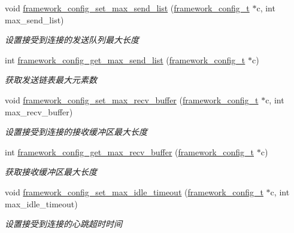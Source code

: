 \begin{DoxyCompactItemize}
void \hyperlink{a00093_ga6d3affd6639a3d75920197811c333fac_ga6d3affd6639a3d75920197811c333fac}{framework\+\_\+config\+\_\+set\+\_\+max\+\_\+send\+\_\+list} (\hyperlink{a00047_a55b26efa9e6ee05514d087ba2593a54b_a55b26efa9e6ee05514d087ba2593a54b}{framework\+\_\+config\+\_\+t} $\ast$c, int max\+\_\+send\+\_\+list)
\begin{DoxyCompactList}\small\item\em 设置接受到连接的发送队列最大长度 \end{DoxyCompactList}\item 
int \hyperlink{a00048_a5fdcaba78c9cbaa69f506d5eed77ca3b_a5fdcaba78c9cbaa69f506d5eed77ca3b}{framework\+\_\+config\+\_\+get\+\_\+max\+\_\+send\+\_\+list} (\hyperlink{a00047_a55b26efa9e6ee05514d087ba2593a54b_a55b26efa9e6ee05514d087ba2593a54b}{framework\+\_\+config\+\_\+t} $\ast$c)
\begin{DoxyCompactList}\small\item\em 获取发送链表最大元素数 \end{DoxyCompactList}\item 
void \hyperlink{a00093_ga582e128041da47fa6578aa150b5a615a_ga582e128041da47fa6578aa150b5a615a}{framework\+\_\+config\+\_\+set\+\_\+max\+\_\+recv\+\_\+buffer} (\hyperlink{a00047_a55b26efa9e6ee05514d087ba2593a54b_a55b26efa9e6ee05514d087ba2593a54b}{framework\+\_\+config\+\_\+t} $\ast$c, int max\+\_\+recv\+\_\+buffer)
\begin{DoxyCompactList}\small\item\em 设置接受到连接的接收缓冲区最大长度 \end{DoxyCompactList}\item 
int \hyperlink{a00048_a1e7e3927ce054f250cd3d87fe9d2705d_a1e7e3927ce054f250cd3d87fe9d2705d}{framework\+\_\+config\+\_\+get\+\_\+max\+\_\+recv\+\_\+buffer} (\hyperlink{a00047_a55b26efa9e6ee05514d087ba2593a54b_a55b26efa9e6ee05514d087ba2593a54b}{framework\+\_\+config\+\_\+t} $\ast$c)
\begin{DoxyCompactList}\small\item\em 获取接收缓冲区最大长度 \end{DoxyCompactList}\item 
void \hyperlink{a00093_ga22047d5186ce58243e3c4308dd851ab6_ga22047d5186ce58243e3c4308dd851ab6}{framework\+\_\+config\+\_\+set\+\_\+max\+\_\+idle\+\_\+timeout} (\hyperlink{a00047_a55b26efa9e6ee05514d087ba2593a54b_a55b26efa9e6ee05514d087ba2593a54b}{framework\+\_\+config\+\_\+t} $\ast$c, int max\+\_\+idle\+\_\+timeout)
\begin{DoxyCompactList}\small\item\em 设置接受到连接的心跳超时时间 \end{DoxyCompactList}\item 

\end{DoxyCompactItemize}
